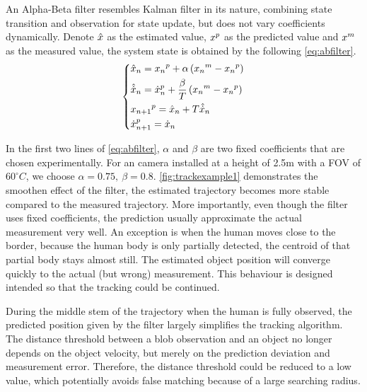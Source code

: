 An Alpha-Beta filter resembles Kalman filter in its nature, combining state transition and observation for state update, but does not vary coefficients dynamically. Denote $\hat{\boldmath{x}}$ as the estimated value, $\boldmath{x}^p$ as the predicted value and $\boldmath{x}^m$ as the measured value, the system state is obtained by the following \autoref{eq:abfilter}.
\begin{equation}\label{eq:abfilter}
  \left\{
  \begin{split}
    & \hat{\boldmath{x}}_n = \boldmath{x_n}^p + \alpha\left(\boldmath{x_n}^m-\boldmath{x_n}^p\right)\\
    & \hat{\boldmath{\dot{x}}}_n = \boldmath{\dot{x}}^p_n + \frac{\beta}{T}\left(\boldmath{x_n}^m-\boldmath{x_n}^p\right)\\
    & \boldmath{x_{n+1}}^p = \hat{\boldmath{x}}_n + T \hat{\boldmath{\dot{x}}}_n\\
    & \boldmath{\dot{x}_{n+1}}^p = \boldmath{\dot{x}_{n}}
  \end{split}
  \right.
\end{equation}

In the first two lines of \autoref{eq:abfilter}, $\alpha$ and $\beta$ are two fixed coefficients that are chosen experimentally. For an camera installed at a height of 2.5m with a FOV of $60^\circ C$, we choose $\alpha=0.75,\ \beta=0.8$. \autoref{fig:trackexample1} demonstrates the smoothen effect of the filter, the estimated trajectory becomes more stable compared to the measured trajectory. More importantly, even though the filter uses fixed coefficients, the prediction usually approximate the actual measurement very well. An exception is when the human moves close to the border, because the human body is only partially detected, the centroid of that partial body stays almost still. The estimated object position will converge quickly to the actual (but wrong) measurement. This behaviour is designed intended so that the tracking could be continued. 

During the middle stem of the trajectory when the human is fully observed, the predicted position given by the filter largely simplifies the tracking algorithm. The distance threshold between a blob observation and an object no longer depends on the object velocity, but merely on the prediction deviation and measurement error. Therefore, the distance threshold could be reduced to a low value, which potentially avoids false matching because of a large searching radius. 

